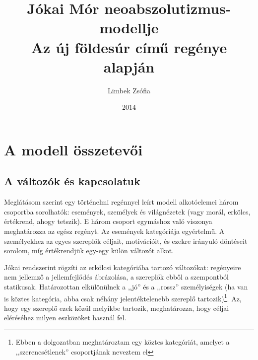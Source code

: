 \documentclass{thesis-ekf}
\theoremstyle{definition}
\begin{document}
    \title{Jókai Mór neoabszolutizmus-modellje\\Az új földesúr című regénye alapján}
    \author{Limbek Zsófia}
    \date{2014}

    \maketitle

    \tableofcontents

    \chapter{A modell összetevői}\label{ch:a-modell-osszetevoi}

    \section{A változók és kapcsolatuk}\label{sec:a-valtozok-es-kapcsolatuk}

    Meglátásom szerint egy történelmi regénnyel leírt modell alkotóelemei három csoportba sorolhatók:
        események, személyek és világnézetek (vagy morál, erkölcs, értékrend, ahogy tetszik).
    E három csoport egymáshoz való viszonya meghatározza az egész regényt.
    Az események kategóriája egyértelmű.
    A személyekhez az egyes szereplők céljait, motivációit, és ezekre irányuló döntéseit sorolom,
        míg értékrendjük egy-egy külön változót alkot.

    Jókai rendszerint rögzíti az erkölcsi kategóriába tartozó változókat:
        regényeire nem jellemző a jellemfejlődés ábrázolása, a szereplők ebből a szempontból statikusak.
    Határozottan elkülönülnek a ,,jó'' és a ,,rossz'' személyiségek (ha van is köztes kategória, abba csak néhány
        jelentéktelenebb szereplő tartozik)\footnote{Ebben a dolgozatban meghatároztam egy köztes kategóriát,
        amelyet a ,,szerencsétlenek'' csoportjának neveztem el}.
    Az, hogy egy szereplő ezek közül melyikbe tartozik, meghatározza, hogy céljai eléréséhez milyen eszközöket használ fel.
\end{document}
